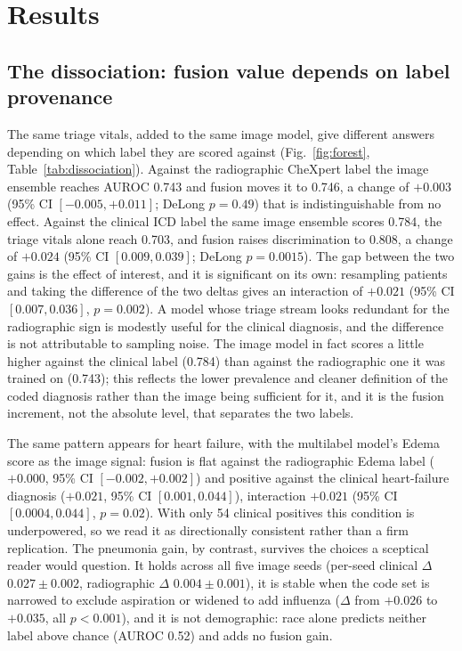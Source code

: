 \documentclass[twocolumn, final]{svjour3}
\begin{document}
\section{Results}
\label{sec:results}

\subsection{The dissociation: fusion value depends on label provenance}
\label{subsec:dissociation}
The same triage vitals, added to the same image model, give different answers depending on
which label they are scored against (Fig.~\ref{fig:forest}, Table~\ref{tab:dissociation}).
Against the radiographic CheXpert label the image ensemble reaches AUROC 0.743 and fusion
moves it to 0.746, a change of $+0.003$ (95\% CI $[-0.005,+0.011]$; DeLong $p{=}0.49$) that
is indistinguishable from no effect. Against the clinical ICD label the same image ensemble
scores 0.784, the triage vitals alone reach 0.703, and fusion raises discrimination to
0.808, a change of $+0.024$ (95\% CI $[0.009,0.039]$; DeLong $p{=}0.0015$). The gap between
the two gains is the effect of interest, and it is significant on its own: resampling
patients and taking the difference of the two deltas gives an interaction of $+0.021$ (95\%
CI $[0.007,0.036]$, $p{=}0.002$). A model whose triage stream looks redundant for the radiographic sign is
modestly useful for the clinical diagnosis, and the difference is not attributable to sampling noise.
The image model in fact scores a little higher against the clinical label (0.784) than
against the radiographic one it was trained on (0.743); this reflects the lower prevalence
and cleaner definition of the coded diagnosis rather than the image being sufficient for it,
and it is the fusion increment, not the absolute level, that separates the two labels.

The same pattern appears for heart failure, with the multilabel model's Edema score as the
image signal: fusion is flat against the radiographic Edema label ($+0.000$, 95\% CI
$[-0.002,+0.002]$) and positive against the clinical heart-failure diagnosis ($+0.021$, 95\%
CI $[0.001,0.044]$), interaction $+0.021$ (95\% CI $[0.0004,0.044]$, $p{=}0.02$). With only
54 clinical positives this condition is underpowered, so we read it as directionally
consistent rather than a firm replication. The pneumonia gain, by contrast, survives the
choices a sceptical reader would question. It holds across all five image seeds (per-seed
clinical $\Delta$ $0.027\pm0.002$, radiographic $\Delta$ $0.004\pm0.001$), it is stable when
the code set is narrowed to exclude aspiration or widened to add influenza ($\Delta$ from
$+0.026$ to $+0.035$, all $p<0.001$), and it is not demographic: race alone predicts neither
label above chance (AUROC 0.52) and adds no fusion gain.
\end{document}
